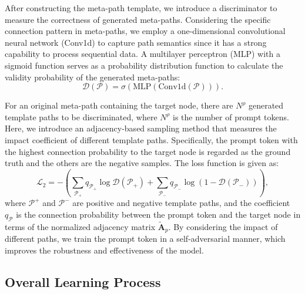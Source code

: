 After constructing the meta-path template, we introduce a discriminator to measure the correctness of generated meta-paths. Considering the specific connection pattern in meta-paths, we employ a one-dimensional convolutional neural network (Conv1d) to capture path semantics since it has a strong capability to process sequential data. A multilayer perceptron (MLP) with a sigmoid function serves as a probability distribution function to calculate the validity probability of the generated meta-paths:
\begin{equation}\label{equ::discriminator}
     \mathcal{D}(\mathcal{P}) = \sigma(\text{MLP}(\text{Conv1d}(\mathcal{P}))).
\end{equation}

For an original meta-path containing the target node, there are $N^\rho$ generated template paths to be discriminated, where $N^\rho$ is the number of prompt tokens. Here, we introduce an adjacency-based sampling method that measures the impact coefficient of different template paths. Specifically, the prompt token with the highest connection probability to the target node is regarded as the ground truth and the others are the negative samples. The loss function is given as:
\begin{equation}\label{equ::template}
    \mathcal{L}_2 = - \left( \sum_{\mathcal{P}_+} q_{\mathcal{P}_+} \log\mathcal{D}(\mathcal{P}_+) + \sum_{\mathcal{P}_-} q_{\mathcal{P}_-} \log(1-\mathcal{D}(\mathcal{P}_-)) \right),
\end{equation}
where $\mathcal{P}^+$ and $\mathcal{P}^-$ are positive and negative template paths, and the coefficient $q_{\mathcal{P}}$ is the connection probability between the prompt token and the target node in terms of the normalized adjacency matrix $\tilde{\bm A}_p$. By considering the impact of different paths, we train the prompt token in a self-adversarial manner, which improves the robustness and effectiveness of the model.


\subsection{Overall Learning Process}

